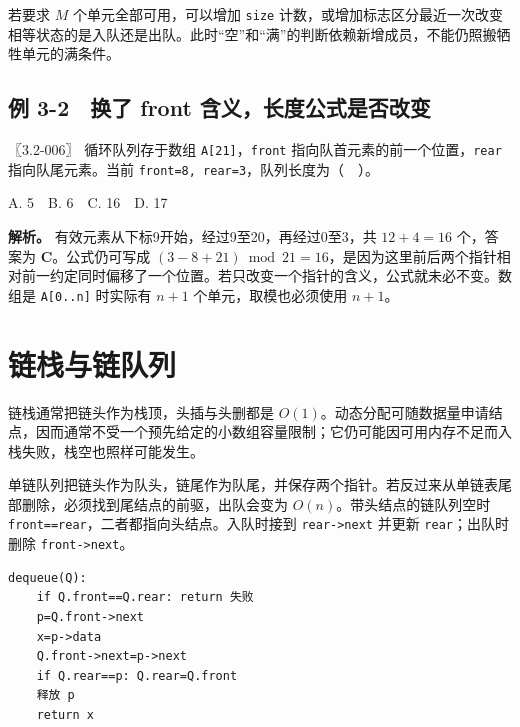 若要求 \(M\) 个单元全部可用，可以增加 \allowbreak{}\texttt{size} 计数，或增加标志区分最近一次改变相等状态的是入队还是出队。此时``空''和``满''的判断依赖新增成员，不能仍照搬牺牲单元的满条件。

\subsection{例 3-2　换了 front 含义，长度公式是否改变}\label{ds-ex3-2}

\noindent{}〖3.2-006〗 循环队列存于数组 \allowbreak{}\texttt{A{[}21{]}}，\allowbreak{}\texttt{front} 指向队首元素的前一个位置，\allowbreak{}\texttt{rear} 指向队尾元素。当前 \allowbreak{}\texttt{front=8,}\allowbreak{}\texttt{\ rear=3}，队列长度为（　）。

A. 5　B. 6　C. 16　D. 17


\textbf{解析。} 有效元素从下标9开始，经过9至20，再经过0至3，共 \(12+4=16\) 个，答案为 \textbf{C}。公式仍可写成 \((3-8+21)\bmod21=16\)，是因为这里前后两个指针相对前一约定同时偏移了一个位置。若只改变一个指针的含义，公式就未必不变。数组是 \allowbreak{}\texttt{A{[}0..n{]}} 时实际有 \(n+1\) 个单元，取模也必须使用 \(n+1\)。

\section{链栈与链队列}\label{ds-03-04}

链栈通常把链头作为栈顶，头插与头删都是 \(O(1)\)。动态分配可随数据量申请结点，因而通常不受一个预先给定的小数组容量限制；它仍可能因可用内存不足而入栈失败，栈空也照样可能发生。

单链队列把链头作为队头，链尾作为队尾，并保存两个指针。若反过来从单链表尾部删除，必须找到尾结点的前驱，出队会变为 \(O(n)\)。带头结点的链队列空时 \allowbreak{}\texttt{front==rear}，二者都指向头结点。入队时接到 \allowbreak{}\texttt{rear-\textgreater{}next} 并更新 \allowbreak{}\texttt{rear}；出队时删除 \allowbreak{}\texttt{front-\textgreater{}next}。

\par\medskip\noindent
\begin{minipage}{\linewidth}
\begin{verbatim}
dequeue(Q):
    if Q.front==Q.rear: return 失败
    p=Q.front->next
    x=p->data
    Q.front->next=p->next
    if Q.rear==p: Q.rear=Q.front
    释放 p
    return x
\end{verbatim}
\end{minipage}\par\medskip

